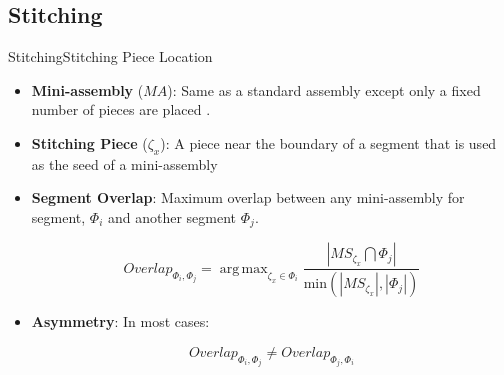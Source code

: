 \documentclass[10pt]{beamer}
\DeclareMathOperator*{\argmax}{arg\,max} %
\begin{document}
\subsection{Stitching}
\begin{frame}{Stitching}{Stitching Piece Location}
  \begin{itemize}
    \item \textbf{Mini-assembly} (\textbf{$MA$}): Same as a standard assembly except only a fixed number of pieces are placed .
    \vfill    
    \item \textbf{Stitching Piece} (\textbf{$\zeta_x$}): A piece near the boundary of a segment that is used as the seed of a mini-assembly
    \vfill
    \item \textbf{Segment Overlap}: Maximum overlap between any mini-assembly for segment, $\Phi_i$ and another segment $\Phi_j$.
    \vfill
		\begin{center}  
		  \vspace{-2em}
			\begin{equation} \label{eq:segmentOverlap}
			  Overlap_{\Phi_i,\Phi_j} = \argmax_{\zeta_x \in \Phi_i} {\frac{|MS_{\zeta_x} \bigcap \Phi_j|}{\text{min}(|MS_{\zeta_x}|, |\Phi_j|)}}
			\end{equation}
			\vspace{-2em}
		\end{center}      
    \vfill
    \item \textbf{Asymmetry}: In most cases:
	  \begin{center}
	    \vspace{-2em}
	    \begin{equation}
	      Overlap_{\Phi_i,\Phi_j} \neq Overlap_{\Phi_j,\Phi_i}
	    \end{equation}
	  \end{center}  
	  \vspace{-1em}
  \end{itemize}
\end{frame}
\end{document}

